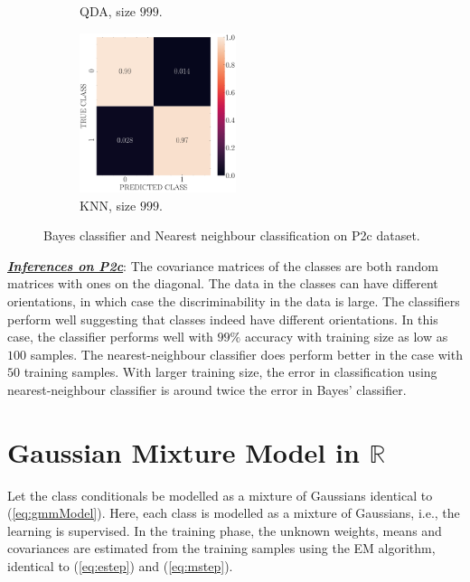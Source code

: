 \documentclass[12pt, a4 paper]{article}
\newcommand{\rr}{\mathbb{R}}
\begin{document}
\begin{figure}[!htbp]
\begin{subfigure}[!htbp]{0.24\textwidth}
       \caption{QDA, size $999$.}
       \label{fig:QDA_rr20_P2c_999}
    \end{subfigure}
\quad \quad
    \begin{subfigure}[!htbp]{0.24\textwidth}
       \centering
       \includegraphics[width=1.8in]{../results/ex2/conf_mtx_KNN_dataset_P2c_size_999.pdf}
       \caption{KNN, size $999$.}
       \label{fig:KNN_rr20_P2c_999}
    \end{subfigure}
\caption{Bayes classifier and Nearest neighbour classification on P2c dataset.}
\label{fig:ex2P2c}
\end{figure}
\underline {\it \bfseries Inferences on P2c}: The covariance matrices of the classes are both random matrices with ones on the diagonal. The data in the classes can have different orientations, in which case the discriminability in the data is large. The classifiers perform well suggesting that classes indeed have different orientations. In this case, the classifier performs well with $99\%$ accuracy with training size as low as $100$ samples. The nearest-neighbour classifier does perform better in the case with $50$ training samples. With larger training size, the error in classification using nearest-neighbour classifier is around twice the error in Bayes' classifier.


\section{Gaussian Mixture Model in $\rr$}
\label{sec:gmm}

\label{prob:3}
Let the class conditionals be modelled as a mixture of Gaussians identical to (\ref{eq:gmmModel}). Here, each class is modelled as a mixture of Gaussians, i.e., the learning is supervised. In the training phase, the unknown weights, means and covariances are estimated from the training samples using the EM algorithm, identical to (\ref{eq:estep}) and (\ref{eq:mstep}). \\
\end{document}
